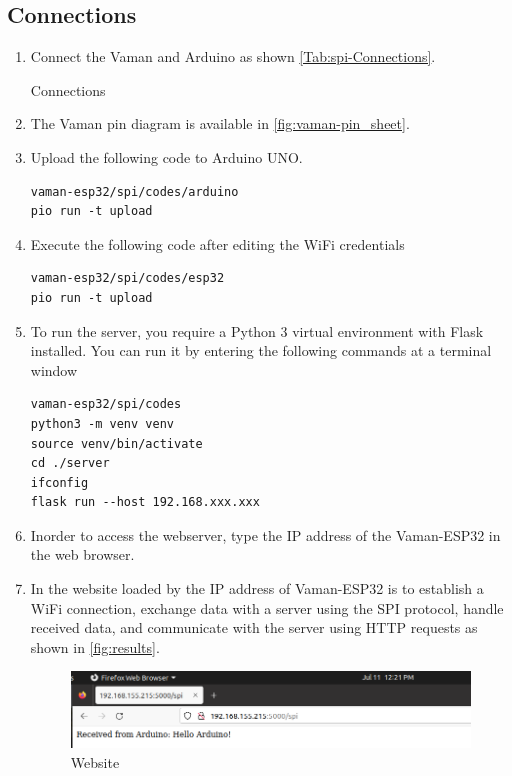 \subsection{Connections}
\begin{enumerate}

\item Connect the Vaman and Arduino as shown \autoref{Tab:spi-Connections}.

\begin{table}[!ht]
\centering

\caption{Connections}
\label{Tab:spi-Connections}
\end{table}
\item The Vaman pin diagram is available in \autoref{fig:vaman-pin_sheet}.

\item Upload the following code to Arduino UNO.

\begin{lstlisting}
vaman-esp32/spi/codes/arduino
pio run -t upload
\end{lstlisting}

\item Execute the following code after editing the WiFi credentials
\begin{lstlisting}
vaman-esp32/spi/codes/esp32
pio run -t upload 
\end{lstlisting}

\item To run the server, you require a Python 3 virtual environment with Flask
installed. You can run it by entering the following commands at a terminal
window
\begin{lstlisting}
vaman-esp32/spi/codes
python3 -m venv venv
source venv/bin/activate
cd ./server
ifconfig
flask run --host 192.168.xxx.xxx
\end{lstlisting}
\item Inorder to access the webserver, type the IP address of the Vaman-ESP32 in
the web browser.
\item In the website loaded by the IP address of Vaman-ESP32 is to establish a
WiFi connection, exchange data with a server using the SPI protocol, handle
received data, and communicate with the server using HTTP requests as shown in
\autoref{fig:results}.
\begin{figure}[!ht]
\centering
\includegraphics[width=\columnwidth]{vaman-esp32/spi/figs/result.png}
\caption{Website}
\label{fig:results}
\end{figure}
\end{enumerate}
